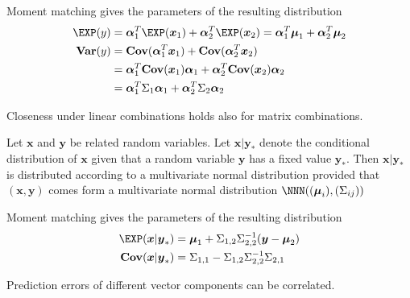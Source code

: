 \documentclass[landscape,footrule]{foils}
\renewcommand{\vec}[1]{\boldsymbol{#1}}
\renewcommand{\VAR}{\mathbf{Var}}
\newcommand{\COV}{\mathbf{Cov}}
\begin{document}
\begin{triangles}
\item Moment matching gives the parameters of the resulting distribution 
\begin{align*}
\EXP(y)&= \vec{\alpha}_1^T\EXP(\vec{x}_1)+\vec{\alpha}_2^T\EXP(\vec{x}_2)=
\vec{\alpha}_1^T\vec{\mu}_1+\vec{\alpha}_2^T\vec{\mu}_2\\
\VAR(y)&=\COV(\vec{\alpha}_1^T \vec{x}_1) + \COV(\vec{\alpha}_2^T \vec{x}_2)\\
&=\vec{\alpha}_1^T \COV(\vec{x}_1)\vec{\alpha}_1+ \vec{\alpha}_2^T \COV(\vec{x}_2)\vec{\alpha}_2\\
&=\vec{\alpha}_1^T \Sigma_1\vec{\alpha}_1+ \vec{\alpha}_2^T \Sigma_2\vec{\alpha}_2
\end{align*}
\item Closeness under linear combinations holds also for matrix combinations. 
\end{triangles}


Let $\vec{x}$ and $\vec{y}$ be related random variables. 
Let $\vec{x}|\vec{y}_*$ denote the conditional distribution of $\vec{x}$ given that a random variable $\vec{y}$ has a fixed value $\vec{y}_*$.
Then $\vec{x}|\vec{y}_*$ is distributed according to a multivariate normal distribution provided that 
 $(\vec{x},\vec{y})$ comes form a multivariate normal distribution $\NNN((\vec{\mu}_i),(\Sigma_{ij}))$

\begin{triangles}
\item Moment matching gives the parameters of the resulting distribution 
\begin{align*}
\EXP(\vec{x}|\vec{y}_*)&= \vec{\mu}_1+ \Sigma_{1,2}\Sigma_{2,2}^{-1}(\vec{y}-\vec{\mu}_2)\\
\COV(\vec{x}|\vec{y}_*)&= \Sigma_{1,1}-\Sigma_{1,2}\Sigma_{2,2}^{-1}\Sigma_{2,1}\\
\end{align*}
\end{triangles}





Prediction errors of different vector components can be correlated.
\vspace*{3ex} 
\end{document}
